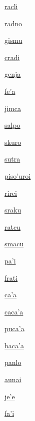 {\hyperlink{val:racli}{racli}}{}{}{}

{\hyperlink{val:radno}{radno}}{}{}{}

{\hyperlink{val:gismu}{gismu}}{}{}{}

{\hyperlink{val:cradi}{cradi}}{}{}{}

{\hyperlink{val:genja}{genja}}{}{}{}

{\hyperlink{val:feha}{fe'a}}{}{}{}

{\hyperlink{val:jimca}{jimca}}{}{}{}

{\hyperlink{val:salpo}{salpo}}{}{}{}

{\hyperlink{val:skuro}{skuro}}{}{}{}

{\hyperlink{val:sutra}{sutra}}{}{}{}

{\hyperlink{val:pisohuroi}{piso'uroi}}{}{}{}

{\hyperlink{val:rirci}{rirci}}{}{}{}

{\hyperlink{val:sraku}{sraku}}{}{}{}

{\hyperlink{val:ratcu}{ratcu}}{}{}{}

{\hyperlink{val:smacu}{smacu}}{}{}{}

{\hyperlink{val:pahi}{pa'i}}{}{}{}

{\hyperlink{val:frati}{frati}}{}{}{}

{\hyperlink{val:caha}{ca'a}}{}{}{}

{\hyperlink{val:cacaha}{caca'a}}{}{}{}

{\hyperlink{val:pucaha}{puca'a}}{}{}{}

{\hyperlink{val:bacaha}{baca'a}}{}{}{}

{\hyperlink{val:panlo}{panlo}}{}{}{}

{\hyperlink{val:aunai}{aunai}}{}{}{}

{\hyperlink{val:jehe}{je'e}}{}{}{}

{\hyperlink{val:fahi}{fa'i}}{}{}{}

